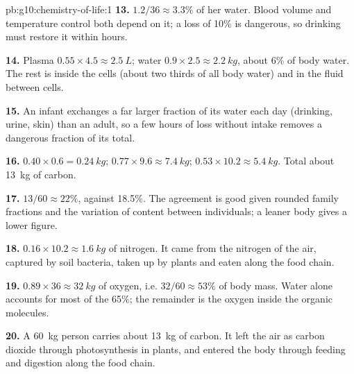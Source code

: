 \begin{solution}{pb:g10:chemistry-of-life:1}
\textbf{13.} $1.2/36 \approx 3.3\%$ of her water. Blood volume and
temperature control both depend on it; a loss of 10\% is dangerous, so
drinking must restore it within hours.

\textbf{14.} Plasma $0.55 \times 4.5 \approx \qty{2.5}{L}$; water $0.9
\times 2.5 \approx \qty{2.2}{kg}$, about 6\% of body water. The rest is
inside the cells (about two thirds of all body water) and in the fluid
between cells.

\textbf{15.} An infant exchanges a far larger fraction of its water
each day (drinking, urine, skin) than an adult, so a few hours of loss
without intake removes a dangerous fraction of its total.

\textbf{16.}  $0.40 \times 0.6 = \qty{0.24}{kg}$; 
$0.77 \times 9.6 \approx \qty{7.4}{kg}$;  $0.53 \times 10.2
\approx \qty{5.4}{kg}$. Total about \qty{13}{kg} of carbon.

\textbf{17.} $13/60 \approx 22\%$, against 18.5\%. The agreement is
good given rounded family fractions and the variation of  content
between individuals; a leaner body gives a lower figure.

\textbf{18.} $0.16 \times 10.2 \approx \qty{1.6}{kg}$ of nitrogen. It
came from the nitrogen of the air, captured by soil bacteria, taken up
by plants and eaten along the food chain.

\textbf{19.} $0.89 \times 36 \approx \qty{32}{kg}$ of oxygen, i.e.
$32/60 \approx 53\%$ of body mass. Water alone accounts for most of the
65\%; the remainder is the oxygen inside the organic molecules.

\textbf{20.} A \qty{60}{kg} person carries about \qty{13}{kg} of
carbon. It left the air as carbon dioxide through photosynthesis in
plants, and entered the body through feeding and digestion along the
food chain.
\end{solution}

